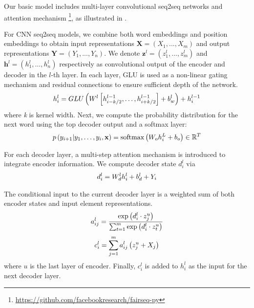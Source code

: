 Our basic model includes multi-layer convolutional seq2seq networks \cite{gehring2017convs2s} and attention mechanism \footnote{\url{https://github.com/facebookresearch/fairseq-py}}, as illustrated in . 

For CNN seq2seq models, we combine both word embeddings and position embeddings to obtain input representations  $\mathbf{X} = (X_1,...,X_m)$ and output representations $\mathbf{Y}=(Y_1,...,Y_n)$. 
We denote $\mathbf { z } ^ { l } = \left( z _ { 1 } ^ { l } , \ldots , z _ { m     } ^ { l } \right)$ and $\mathbf { h } ^ { l } = \left( h _ { 1 } ^ { l } , \ldots , h _ { n } ^ { l } \right)$ 
respectively as convolutional output of the encoder and
decoder in the $l$-th layer.
In each layer, GLU \cite{DauphinFAG17} is used as a non-linear 
gating mechanism and residual connections \cite{HeZRS16} to 
ensure sufficient depth of the network.  
\begin{equation}
\small
    h _ { i } ^ { l } = GLU \left( W ^ { l } \left[ h _ {i-k/2 } ^ { l - 1 } , \ldots , h _ { i+k/2 } ^ { l - 1 } \right] + b _ { w } ^ { l } \right) + h _ { i } ^ { l - 1 }
\end{equation} 
where \textit{k} is kernel width.
Next, we compute the probability distribution for the next word
using the top decoder output and a softmax layer:
\begin{equation}
\small
    p \left( y _ { i + 1 } | y _ { 1 } , \ldots , y _ { i } , \mathbf { x } \right) = \operatorname { softmax } \left( W _ { o } h _ { i } ^ { L } + b _ { o } \right) \in \mathbb { R } ^ { T }
\end{equation}

For each decoder layer, a multi-step attention mechanism is introduced to integrate encoder information. We compute decoder state $d_{i}^{l}$ via
\begin{equation}
\small
    d _ { i } ^ { l } = W _ { d } ^ { l } h _ { i } ^ { l } + b _ { d } ^ { l } + Y _ { i }
\end{equation}

The conditional input to the current 
decoder layer is a weighted sum of both encoder states and input element representations.
\begin{equation}\label{eq:a}
\small
    a _ { i j } ^ { l } = \frac { \exp \left( d _ { i } ^ { l } \cdot z _ { j } ^ { u } \right) } { \sum _ { t = 1 } ^ { m } \exp \left( d _ { i } ^ { l } \cdot z _ { t } ^ { u } \right) }
\end{equation}
\begin{equation}\label{eq:c}
\small
    c _ { i } ^ { l } = \sum _ { j = 1 } ^ { m } a _ { i j } ^ { l } \left( z _ { j } ^ { u } + X_j \right)
\end{equation}
where $u$ is the last layer of encoder.  
Finally, $c _ { i } ^ { l }$ is added to $h_{i}^{l}$ as the input for the next decoder layer.

